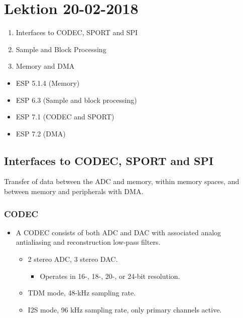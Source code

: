 \section{Lektion 20-02-2018}

\begin{enumerate}
	\item Interfaces to CODEC, SPORT and SPI
	\item Sample and Block Processing
	\item Memory and DMA
\end{enumerate}

\begin{mdframed}[style=exampledefault]
\begin{itemize}
	\item ESP 5.1.4 (Memory)
	\item ESP 6.3 (Sample and block processing)
	\item ESP 7.1 (CODEC and SPORT)
	\item ESP 7.2 (DMA)
\end{itemize}
\end{mdframed}

\subsection{Interfaces to CODEC, SPORT and SPI}
Transfer of data between the ADC and memory, within memory spaces, and between memory and peripherals with DMA.

\subsubsection{CODEC}
\begin{itemize}
	\item A CODEC consists of both ADC and DAC with associated analog antialiasing and reconstruction low-pass filters.
	\begin{itemize}
		\item 2 stereo ADC, 3 stereo DAC.
		\begin{itemize}
			\item Operates in 16-, 18-, 20-, or 24-bit resolution.
		\end{itemize}
		\item TDM mode, 48-kHz sampling rate.
		\item I2S mode, 96 kHz sampling rate, only primary channels active.
	\end{itemize}
\end{itemize}

